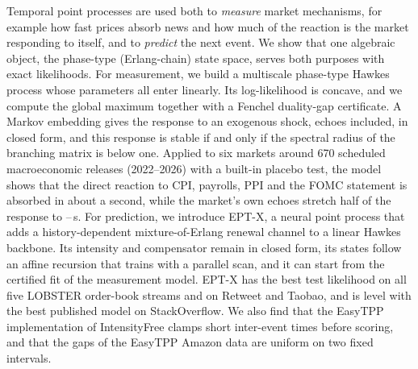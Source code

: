 Temporal point processes are used both to \emph{measure} market mechanisms, for example how fast
prices absorb news and how much of the reaction is the market responding to itself, and to
\emph{predict} the next event. We show that one algebraic object, the phase-type (Erlang-chain)
state space, serves both purposes with exact likelihoods. For measurement, we build a multiscale
phase-type Hawkes process whose parameters all enter linearly. Its log-likelihood is concave, and
we compute the global maximum together with a Fenchel duality-gap certificate. A Markov embedding
gives the response to an exogenous shock, echoes included, in closed form, and this response is
stable if and only if the spectral radius of the branching matrix is below one. Applied to six
markets around 670 scheduled macroeconomic releases (2022--2026) with a built-in placebo test, the
model shows that the direct reaction to CPI, payrolls, PPI and the FOMC statement is absorbed in
about a second, while the market's own echoes stretch half of the response to
\tEchoLo--\tEchoHi{}\,s. For prediction, we introduce EPT-X, a neural point process that adds a
history-dependent mixture-of-Erlang renewal channel to a linear Hawkes backbone. Its intensity
and compensator remain in closed form, its states follow an affine recursion that trains with a
parallel scan, and it can start from the certified fit of the measurement model. EPT-X has the best test likelihood on
all five LOBSTER order-book streams and on Retweet and Taobao, and is level with the best published
model on StackOverflow. We also find that the EasyTPP implementation of IntensityFree clamps short
inter-event times before scoring, and that the gaps of the EasyTPP Amazon data are uniform on two
fixed intervals.
